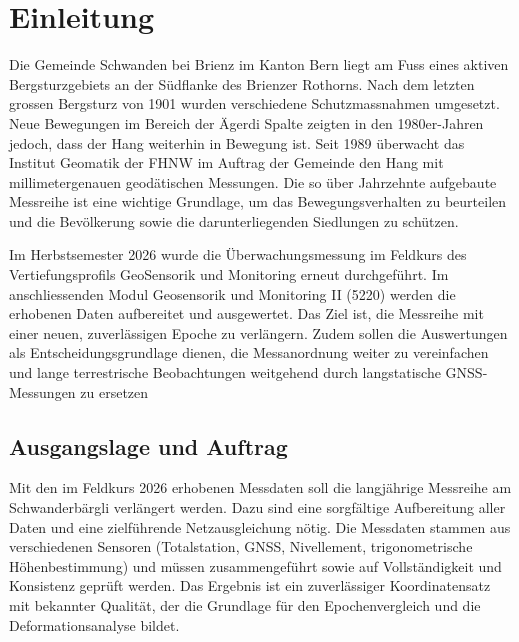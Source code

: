 \clearpage
\section{Einleitung}
\label{sec:einleitung}

Die Gemeinde Schwanden bei Brienz im Kanton Bern liegt am Fuss eines aktiven Bergsturzgebiets
an der Südflanke des Brienzer Rothorns. Nach dem letzten grossen Bergsturz von 1901
wurden verschiedene Schutzmassnahmen umgesetzt. Neue Bewegungen im Bereich der Ägerdi
Spalte zeigten in den 1980er-Jahren jedoch, dass der Hang weiterhin in Bewegung ist.
Seit 1989 überwacht das Institut Geomatik der FHNW im Auftrag der Gemeinde den Hang
mit millimetergenauen geodätischen Messungen. Die so über Jahrzehnte aufgebaute 
Messreihe ist eine wichtige Grundlage, um das Bewegungsverhalten zu beurteilen und 
die Bevölkerung sowie die darunterliegenden Siedlungen zu schützen.


Im Herbstsemester 2026 wurde die Überwachungsmessung im Feldkurs des Vertiefungsprofils
GeoSensorik und Monitoring erneut durchgeführt. Im anschliessenden Modul Geosensorik und 
Monitoring II (5220) werden die erhobenen Daten aufbereitet und ausgewertet. Das Ziel 
ist, die Messreihe mit einer neuen, zuverlässigen Epoche zu verlängern. Zudem sollen 
die Auswertungen als Entscheidungsgrundlage dienen, die Messanordnung weiter zu vereinfachen
und lange terrestrische Beobachtungen weitgehend durch langstatische GNSS-Messungen 
zu ersetzen

\subsection{Ausgangslage und Auftrag}
Mit den im Feldkurs 2026 erhobenen Messdaten soll die langjährige Messreihe am
Schwanderbärgli verlängert werden. Dazu sind eine sorgfältige Aufbereitung aller Daten
und eine zielführende Netzausgleichung nötig. Die Messdaten stammen aus verschiedenen
Sensoren (Totalstation, GNSS, Nivellement, trigonometrische Höhenbestimmung) und müssen
zusammengeführt sowie auf Vollständigkeit und Konsistenz geprüft werden. Das Ergebnis
ist ein zuverlässiger Koordinatensatz mit bekannter Qualität, der die Grundlage für
den Epochenvergleich und die Deformationsanalyse bildet.

